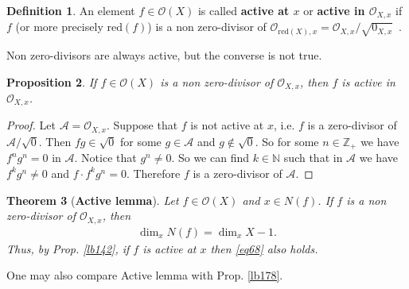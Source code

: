\documentclass[12pt,b5paper,notitlepage]{report}
\theoremstyle{definition}
\newtheorem{df}{Definition}[section]
\theoremstyle{plain}
\newtheorem{thm}[df]{Theorem}
\newtheorem{pp}[df]{Proposition}
\newcommand{\scr}{\mathscr}
\newcommand{\Nbb}{\mathbb N}
\newcommand{\Zbb}{\mathbb Z}
\newcommand{\red}{\mathrm{red}}
\numberwithin{equation}{section}
\begin{document}
\begin{df}
An element $f\in\scr O(X)$ is called \textbf{active at $x$} or \textbf{active in $\scr O_{X,x}$}  if $f$ (or more precisely $\red(f)$) is a non zero-divisor of $\scr O_{\red(X),x}=\scr O_{X,x}/\sqrt{0_{X,x}}$~.
\end{df}

Non zero-divisors are always active, but the converse is not true.

\begin{pp}
If $f\in\scr O(X)$ is a non zero-divisor of $\scr O_{X,x}$, then $f$ is active in $\scr O_{X,x}$.
\end{pp}

\begin{proof}
Let $\scr A=\scr O_{X,x}$. Suppose that $f$ is not active at $x$, i.e. $f$ is a zero-divisor of $\scr A/\sqrt{0}$. Then $fg\in\sqrt{0}$ for some $g\in\scr A$ and $g\notin\sqrt{0}$. So for some $n\in\Zbb_+$ we have $f^ng^n=0$ in $\scr A$. Notice that $g^n\neq 0$. So we can find $k\in\Nbb$ such that in $\scr A$ we have $f^kg^n\neq 0$ and $f\cdot f^kg^n=0$. Therefore $f$ is a zero-divisor of $\scr A$.
\end{proof}









\begin{thm}[\textbf{Active lemma}]\label{lb302}
Let $f\in\scr O(X)$ and $x\in N(f)$. If $f$ is a non zero-divisor of $\scr O_{X,x}$, then
\begin{align}
\dim_x N(f)=\dim_x X-1.\label{eq68}
\end{align}
Thus, by Prop. \ref{lb142}, if $f$ is active at $x$ then \eqref{eq68} also holds.
\end{thm}

One may also compare Active lemma with Prop. \ref{lb178}. 
\end{document}
